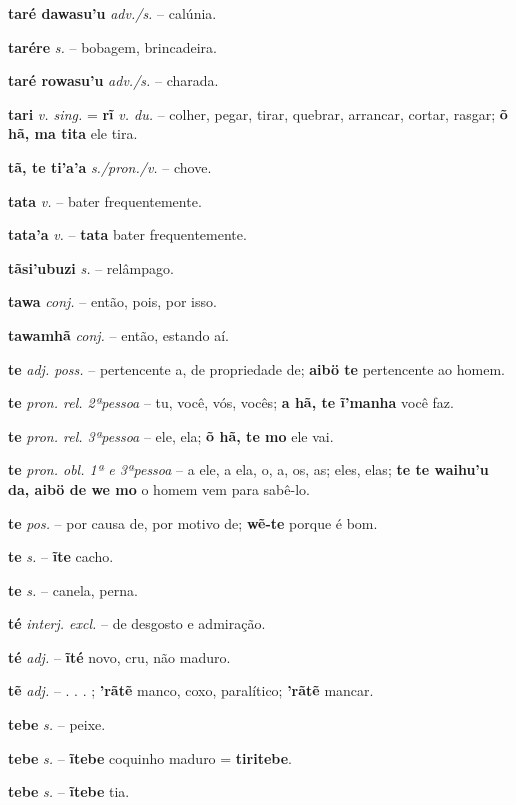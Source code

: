 \textbf{taré dawasu'u} \textit{adv./s.} -- calúnia.

\textbf{tarére} \textit{s.} -- bobagem, brincadeira.

\textbf{taré rowasu'u} \textit{adv./s.} -- charada.

\textbf{tari} \textit{v. sing.} = \textbf{rĩ} \textit{v. du.} -- colher, pegar, tirar, quebrar, arrancar, cortar, rasgar; \textbf{õ hã, ma tita} ele tira.

\textbf{tã, te ti'a'a} \textit{s./pron./v.} -- chove.

\textbf{tata} \textit{v.} -- bater frequentemente.

\textbf{tata'a} \textit{v.} -- \textbf{tata} bater frequentemente.

\textbf{tãsi'ubuzi} \textit{s.} -- relâmpago.

\textbf{tawa} \textit{conj.} -- então, pois, por isso.

\textbf{tawamhã} \textit{conj.} -- então, estando aí.

\textbf{te} \textit{adj. poss.} -- pertencente a, de propriedade de; \textbf{aibö te} pertencente ao homem.

\textbf{te} \textit{pron. rel. 2ªpessoa} -- tu, você, vós, vocês; \textbf{a hã, te ĩ'manha} você faz.

\textbf{te} \textit{pron. rel. 3ªpessoa} -- ele, ela; \textbf{õ hã, te mo} ele vai.

\textbf{te} \textit{pron. obl. 1ª e 3ªpessoa} -- a ele, a ela, o, a, os, as; eles, elas; \textbf{te te waihu'u da, aibö de we mo} o homem vem para sabê-lo.

\textbf{te} \textit{pos.} -- por causa de, por motivo de; \textbf{wẽ-te} porque é bom.

\textbf{te} \textit{s.} -- \textbf{ĩte} cacho.

\textbf{te} \textit{s.} -- canela, perna.

\textbf{té} \textit{interj. excl.} -- de desgosto e admiração.

\textbf{té} \textit{adj.} -- \textbf{ĩté} novo, cru, não maduro.

\textbf{tẽ} \textit{adj.} -- . . . ; \textbf{'rãtẽ} manco, coxo, paralítico; \textbf{'rãtẽ} mancar.

\textbf{tebe} \textit{s.} -- peixe.

\textbf{tebe} \textit{s.} -- \textbf{ĩtebe} coquinho maduro = \textbf{tiritebe}.

\textbf{tebe} \textit{s.} -- \textbf{ĩtebe} tia.

